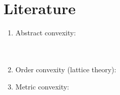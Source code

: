 \section{Literature}
\begin{survey}
\begin{enumerate}
  \item Abstract convexity:
    \\
    \\ 
    \\

  \item Order convexity (lattice theory):
    \\

  \item Metric convexity:
    \\
    \\
    \\


\end{enumerate}
\end{survey}




